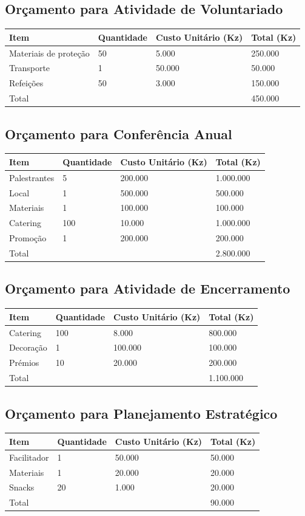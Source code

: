 \documentclass[12pt]{article}
\begin{document}
\subsection{Orçamento para Atividade de Voluntariado}
\begin{longtable}{|l|l|l|l|}
\hline
Item & Quantidade & Custo Unitário (Kz) & Total (Kz) \\
\hline
Materiais de proteção & 50 & 5.000 & 250.000 \\
Transporte & 1 & 50.000 & 50.000 \\
Refeições & 50 & 3.000 & 150.000 \\
\hline
Total & & & 450.000 \\
\hline
\end{longtable}

\subsection{Orçamento para Conferência Anual}
\begin{longtable}{|l|l|l|l|}
\hline
Item & Quantidade & Custo Unitário (Kz) & Total (Kz) \\
\hline
Palestrantes & 5 & 200.000 & 1.000.000 \\
Local & 1 & 500.000 & 500.000 \\
Materiais & 1 & 100.000 & 100.000 \\
Catering & 100 & 10.000 & 1.000.000 \\
Promoção & 1 & 200.000 & 200.000 \\
\hline
Total & & & 2.800.000 \\
\hline
\end{longtable}

\subsection{Orçamento para Atividade de Encerramento}
\begin{longtable}{|l|l|l|l|}
\hline
Item & Quantidade & Custo Unitário (Kz) & Total (Kz) \\
\hline
Catering & 100 & 8.000 & 800.000 \\
Decoração & 1 & 100.000 & 100.000 \\
Prémios & 10 & 20.000 & 200.000 \\
\hline
Total & & & 1.100.000 \\
\hline
\end{longtable}

\subsection{Orçamento para Planejamento Estratégico}
\begin{longtable}{|l|l|l|l|}
\hline
Item & Quantidade & Custo Unitário (Kz) & Total (Kz) \\
\hline
Facilitador & 1 & 50.000 & 50.000 \\
Materiais & 1 & 20.000 & 20.000 \\
Snacks & 20 & 1.000 & 20.000 \\
\hline
Total & & & 90.000 \\
\hline
\end{longtable}
\end{document}
